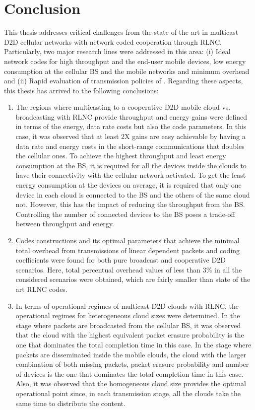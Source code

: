 \section{Conclusion}\label{sec:conclusion}

This thesis addresses critical challenges from the state of the art in multicast \ac{D2D} cellular networks with network coded cooperation through \ac{RLNC}. Particularly, two major research lines were addressed in this area: (i) Ideal network codes for high throughput and the end-user mobile devices, low energy consumption at the cellular \ac{BS} and the mobile networks and minimum overhead and (ii) Rapid evaluation of transmission policies of . Regarding these aspects, this thesis has arrived to the following conclusions:

\begin{enumerate}

\item The regions where multicasting to a cooperative \ac{D2D} mobile cloud vs. broadcasting with \ac{RLNC} provide throughput and energy gains were defined in terms of the energy, data rate costs but also the code parameters. In this case, it was observed that at least 2X gains are easy achievable by having a data rate and energy costs in the short-range communications that doubles the cellular ones. To achieve the highest throughput and least energy consumption at the \ac{BS}, it is required for all the devices inside the clouds to have their connectivity with the cellular network activated. To get the least energy consumption at the devices on average, it is required that only one device in each cloud is connected to the \ac{BS} and the others of the same cloud not. However, this has the impact of reducing the throughput from the \ac{BS}. Controlling the number of connected devices to the \ac{BS} poses a trade-off between throughput and energy.

\item Codes constructions and its optimal parameters that achieve the minimal total overhead from transmissions of linear dependent packets and coding coefficients were found for both pure broadcast and cooperative \ac{D2D} scenarios. Here, total percentual overhead values of less than 3\% in all the considered scenarios were obtained, which are fairly smaller than state of the art \ac{RLNC} codes.

\item In terms of operational regimes of multicast \ac{D2D} clouds with \ac{RLNC}, the operational regimes for heterogeneous cloud sizes were determined. In the stage where packets are broadcasted from the cellular \ac{BS}, it was observed that the cloud with the highest equivalent packet erasure probability is the one that dominates the total completion time in this case. In the stage where packets are disseminated inside the mobile clouds, the cloud with the larger combination of both missing packets, packet erasure probability and number of devices is the one that dominates the total completion time in this case. Also, it was observed that the homogeneous cloud size provides the optimal operational point since, in each transmission stage, all the clouds take the same time to distribute the content. 


\end{enumerate}
